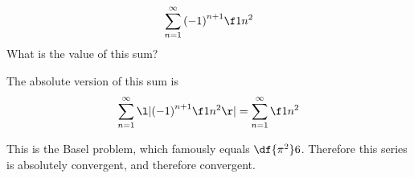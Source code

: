 \documentclass[a4paper]{article}
\begin{document}
\subsection{~} %

\begin{questionbody}
\[ \sum_{n=1}^\infty {(-1)}^{n+1} \f1{n^2} \]
What is the value of this sum?
\end{questionbody}

The absolute version of this sum is \[
\sum_{n=1}^\infty \l\vert {(-1)}^{n+1} \f1{n^2} \r\vert = \sum_{n=1}^\infty \f1{n^2}
\]

This is the Basel problem, which famously equals $\df{\pi^2}6$. Therefore this series is absolutely convergent, and therefore convergent.
\end{document}
